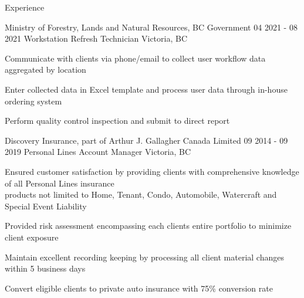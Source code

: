 \documentclass{resume}
\begin{document}
\begin{headersection}
    {Experience}

    \begin{itemsection}
        {Ministry of Forestry, Lands and Natural Resources, BC Government}
        {04 2021 - 08 2021}
        {Workstation Refresh Technician}
        {Victoria, BC}

        \item Communicate with clients via phone/email to collect user workflow data aggregated by location
        \item Enter collected data in Excel template and process user data through in-house ordering system
        \item Perform quality control inspection and submit to direct report
    \end{itemsection}
    \itemsectionskip
    \begin{itemsection}
        {Discovery Insurance, part of Arthur J. Gallagher Canada Limited}
        {09 2014 - 09 2019}
        {Personal Lines Account Manager}
        {Victoria, BC}

        \item Ensured customer satisfaction by providing clients with comprehensive knowledge of all Personal Lines insurance \\
            products not limited to Home, Tenant, Condo, Automobile, Watercraft and Special Event Liability
        \item Provided risk assessment encompassing each clients entire portfolio to minimize client exposure
        \item Maintain excellent recording keeping by processing all client material changes within 5 business days
        \item Convert eligible clients to private auto insurance with 75\% conversion rate
    \end{itemsection}

\end{headersection}
\end{document}
